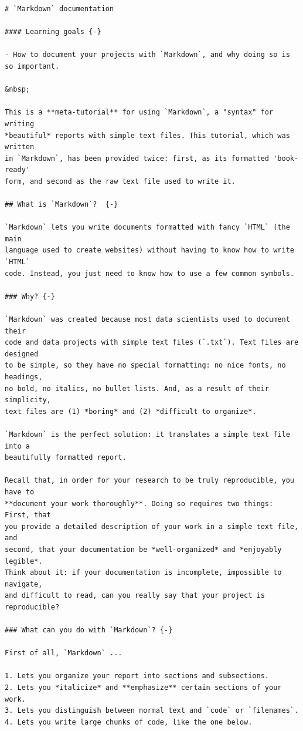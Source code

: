 \documentclass[]{book}
\begin{document}
\begin{verbatim}
# `Markdown` documentation 

#### Learning goals {-}

- How to document your projects with `Markdown`, and why doing so is so important.

&nbsp;  

This is a **meta-tutorial** for using `Markdown`, a "syntax" for writing
*beautiful* reports with simple text files. This tutorial, which was written
in `Markdown`, has been provided twice: first, as its formatted 'book-ready' 
form, and second as the raw text file used to write it.  

## What is `Markdown`?  {-}  

`Markdown` lets you write documents formatted with fancy `HTML` (the main
language used to create websites) without having to know how to write `HTML`
code. Instead, you just need to know how to use a few common symbols. 

### Why? {-} 

`Markdown` was created because most data scientists used to document their
code and data projects with simple text files (`.txt`). Text files are designed
to be simple, so they have no special formatting: no nice fonts, no headings,
no bold, no italics, no bullet lists. And, as a result of their simplicity,
text files are (1) *boring* and (2) *difficult to organize*.  

`Markdown` is the perfect solution: it translates a simple text file into a
beautifully formatted report.  

Recall that, in order for your research to be truly reproducible, you have to
**document your work thoroughly**. Doing so requires two things: First, that
you provide a detailed description of your work in a simple text file, and
second, that your documentation be *well-organized* and *enjoyably legible*.
Think about it: if your documentation is incomplete, impossible to navigate,
and difficult to read, can you really say that your project is reproducible?

### What can you do with `Markdown`? {-}  

First of all, `Markdown` ...  

1. Lets you organize your report into sections and subsections.  
2. Lets you *italicize* and **emphasize** certain sections of your work. 
3. Lets you distinguish between normal text and `code` or `filenames`. 
4. Lets you write large chunks of code, like the one below. 


\end{verbatim}
\end{document}
